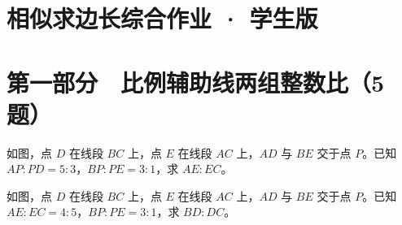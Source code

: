 \documentclass{exam-zh}
\begin{document}
\section*{相似求边长综合作业 · 学生版}

\section*{第一部分　比例辅助线两组整数比（5题）}


\begin{problem}[points=10]
  \noindent
  \begin{minipage}[t]{\dimexpr\linewidth-60mm-6mm\relax}
    \vspace{0pt}
    如图，点 $D$ 在线段 $BC$ 上，点 $E$ 在线段 $AC$ 上，$AD$ 与 $BE$ 交于点 $P$。已知 $AP:PD=5:3$，$BP:PE=3:1$，求 $AE:EC$。
    
  \end{minipage}\hfill
  \begin{diagramcoltikz}{60mm}{}
  }
  \end{diagramcoltikz}
  \par\medskip
  \answerarea[36mm]
\end{problem}



\begin{problem}[points=10]
  \noindent
  \begin{minipage}[t]{\dimexpr\linewidth-60mm-6mm\relax}
    \vspace{0pt}
    如图，点 $D$ 在线段 $BC$ 上，点 $E$ 在线段 $AC$ 上，$AD$ 与 $BE$ 交于点 $P$。已知 $AE:EC=4:5$，$BP:PE=3:1$，求 $BD:DC$。
    
  \end{minipage}\hfill
  \begin{diagramcoltikz}{60mm}{}
  }
  \end{diagramcoltikz}
  \par\medskip
  \answerarea[36mm]
\end{problem}


\end{document}
